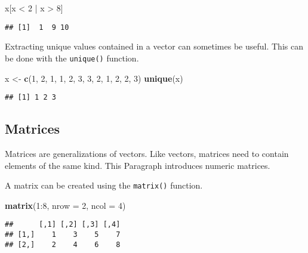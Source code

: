 \documentclass[]{book}
\newenvironment{Shaded}{\begin{snugshade}}{\end{snugshade}}
\newcommand{\KeywordTok}[1]{\textcolor[rgb]{0.13,0.29,0.53}{\textbf{{#1}}}}
\newcommand{\DataTypeTok}[1]{\textcolor[rgb]{0.13,0.29,0.53}{{#1}}}
\newcommand{\DecValTok}[1]{\textcolor[rgb]{0.00,0.00,0.81}{{#1}}}
\newcommand{\StringTok}[1]{\textcolor[rgb]{0.31,0.60,0.02}{{#1}}}
\newcommand{\NormalTok}[1]{{#1}}
\begin{document}
\begin{Shaded}
\begin{Highlighting}[]
\NormalTok{x[x <}\StringTok{ }\DecValTok{2} \NormalTok{|}\StringTok{ }\NormalTok{x >}\StringTok{ }\DecValTok{8}\NormalTok{]}
\end{Highlighting}
\end{Shaded}

\begin{verbatim}
## [1]  1  9 10
\end{verbatim}

Extracting unique values contained in a vector can sometimes be useful.
This can be done with the \texttt{unique()} function.

\begin{Shaded}
\begin{Highlighting}[]
\NormalTok{x <-}\StringTok{ }\KeywordTok{c}\NormalTok{(}\DecValTok{1}\NormalTok{, }\DecValTok{2}\NormalTok{, }\DecValTok{1}\NormalTok{, }\DecValTok{1}\NormalTok{, }\DecValTok{2}\NormalTok{, }\DecValTok{3}\NormalTok{, }\DecValTok{3}\NormalTok{, }\DecValTok{2}\NormalTok{, }\DecValTok{1}\NormalTok{, }\DecValTok{2}\NormalTok{, }\DecValTok{2}\NormalTok{, }\DecValTok{3}\NormalTok{)}
\KeywordTok{unique}\NormalTok{(x)}
\end{Highlighting}
\end{Shaded}

\begin{verbatim}
## [1] 1 2 3
\end{verbatim}

\subsection{Matrices}\label{matrices}

Matrices are generalizations of vectors. Like vectors, matrices need to
contain elements of the same kind. This Paragraph introduces numeric
matrices.

A matrix can be created using the \texttt{matrix()} function.

\begin{Shaded}
\begin{Highlighting}[]
\KeywordTok{matrix}\NormalTok{(}\DecValTok{1}\NormalTok{:}\DecValTok{8}\NormalTok{, }\DataTypeTok{nrow =} \DecValTok{2}\NormalTok{, }\DataTypeTok{ncol =} \DecValTok{4}\NormalTok{)}
\end{Highlighting}
\end{Shaded}

\begin{verbatim}
##      [,1] [,2] [,3] [,4]
## [1,]    1    3    5    7
## [2,]    2    4    6    8
\end{verbatim}
\end{document}
